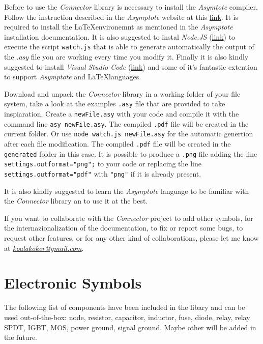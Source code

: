 \documentclass[a4paper,12pt]{report}
\begin{document}
Before to use the \emph{Connector} library is necessary to install the \emph{Asymtote} compiler. Follow the instruction described in the \emph{Asymptote} website at this \href{https://asymptote.sourceforge.io}{link}. It is required to install the \LaTeX environemnt as mentioned in the \emph{Asymptote} installation documentation. It is also suggested to instal \emph{Node.JS} (\href{https://nodejs.org}{link}) to execute the script \texttt{watch.js} that is able to generate automatically the output of the \emph{.asy} file you are working every time you modify it. Finally it is also kindly suggested to install \emph{Visual Studio Code} (\href{https://code.visualstudio.com}{link}) and some of it's fantastic extention to support \emph{Asymptote} and \LaTeX languages.

Download and unpack the \emph{Connector} library in a working folder of your file system, take a look at the examples \texttt{.asy} file that are provided to take inspiaration. Create a \texttt{newFile.asy} with your code and compile it with the command line \texttt{asy newFile.asy}. The compiled \texttt{.pdf} file will be created in the current folder. Or use \texttt{node watch.js newFile.asy} for the automatic genertion after each file modification. The compiled \texttt{.pdf} file will be created in the \texttt{generated} folder in this case. It is possible to produce a \texttt{.png} file adding the line \texttt{settings.outformat="png";} to your code or replacing the line \texttt{settings.outformat="pdf"} with \texttt{"png"} if it is already present.

It is also kindly suggested to learn the \emph{Asymptote} language to be familiar with the \emph{Connector} library an to use it at the best.

If you want to collaborate with the \emph{Connector} project to add other symbols, for the internazionalization of the documentation, to fix or report some bugs, to request other features, or for any other kind of collaborations, please let me know at \emph{\href{mailto:koalakoker@gmail.com}{koalakoker@gmail.com}}.

\section*{Electronic Symbols}

The following list of components have been included in the libary and can be used out-of-the-box: node, resistor, capacitor, inductor, fuse, diode, relay, relay SPDT, IGBT, MOS, power ground, signal ground. Maybe other will be added in the future.
\end{document}
